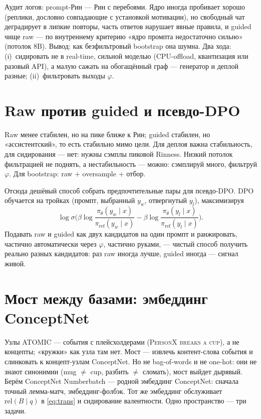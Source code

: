 \begin{pitfall}
Аудит логов: prompt-Рин — Рин с перебоями. Ядро иногда пробивает хорошо (реплики,
дословно совпадающие с установкой мотивации), но свободный чат деградирует в липкие
повторы, часть ответов нарушает явные правила, и guided чище raw — по внутреннему
критерию «ядро промпта недостаточно сильно» (потолок $8$B). Вывод: как
безфильтровый bootstrap она шумна. Два хода: (i)~сидировать не в real-time, сильной
моделью (CPU-offload, квантизация или разовый API), а малую сажать на обогащённый
граф — генератор и деплой разные; (ii)~фильтровать выходы $\varphi$.
\end{pitfall}

\section{Raw против guided и псевдо-DPO}

Raw менее стабилен, но на пике ближе к Рин; guided стабилен, но «ассистентский»,
то есть стабильно мимо цели. Для деплоя важна стабильность, для сидирования — нет:
нужны сэмплы пиковой Rinness. Низкий потолок фильтрацией не поднять, а
нестабильность — можно: сэмплируй много, фильтруй $\varphi$. Для bootstrap:
raw $+$ oversample $+$ отбор.

Отсюда дешёвый способ собрать предпочтительные пары для псевдо-DPO. DPO обучается на
тройках (промпт, выбранный $y_w$, отвергнутый $y_l$), максимизируя
\[
\log \sigma\!\Big(
\beta \log \frac{\pi_\theta(y_w\mid x)}{\pi_{\text{ref}}(y_w\mid x)}
- \beta \log \frac{\pi_\theta(y_l\mid x)}{\pi_{\text{ref}}(y_l\mid x)}
\Big).
\]
Подавать raw и guided как двух кандидатов на один промпт и ранжировать, частично
автоматически через $\varphi$, частично руками, — чистый способ получить реально
разных кандидатов: раз raw иногда лучше, guided иногда — сигнал живой.

\section{Мост между базами: эмбеддинг ConceptNet}

Узлы ATOMIC — события с плейсхолдерами (\textsc{PersonX breaks a cup}), а не
концепты; «кружки» как узла там нет. Мост — извлечь контент-слова события и
слинковать к концепт-узлам ConceptNet. Но не bag-of-words и не one-hot: они не знают
синонимии (mug $\ne$ cup, разбить $\ne$ сломать), мост выйдет дырявый. Берём
ConceptNet Numberbatch — родной эмбеддинг ConceptNet: сначала точный лемма-матч,
эмбеддинг-фолбэк. Тот же эмбеддинг обслуживает $\text{rel}(B\mid q)$ в
\eqref{eq:trans} и сидирование валентности. Одно пространство — три задачи.
